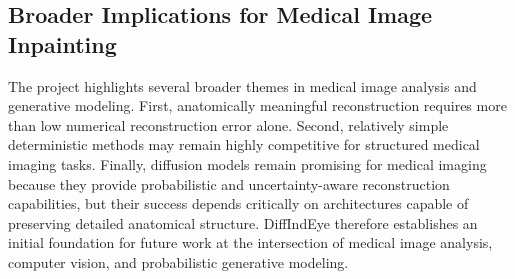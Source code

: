 \documentclass[12pt,oneside]{article}
\begin{document}
\subsection*{Broader Implications for Medical Image Inpainting}

The project highlights several broader themes in medical image analysis and generative modeling. First, anatomically meaningful reconstruction requires more than low numerical reconstruction error alone. Second, relatively simple deterministic methods may remain highly competitive for structured medical imaging tasks. Finally, diffusion models remain promising for medical imaging because they provide probabilistic and uncertainty-aware reconstruction capabilities, but their success depends critically on architectures capable of preserving detailed anatomical structure. DiffIndEye therefore establishes an initial foundation for future work at the intersection of medical image analysis, computer vision, and probabilistic generative modeling.



\end{document}
